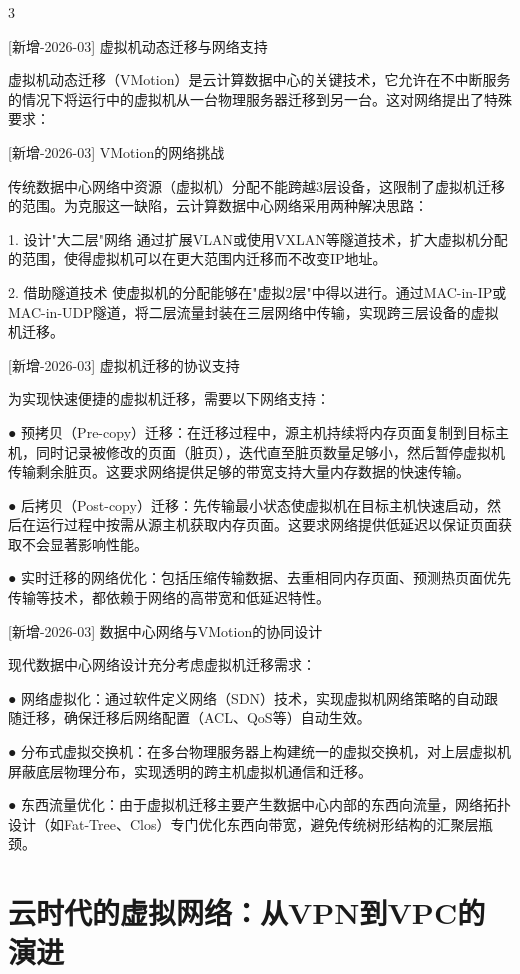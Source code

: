                                                     3


[新增-2026-03] 虚拟机动态迁移与网络支持

虚拟机动态迁移（VMotion）是云计算数据中心的关键技术，它允许在不中断服务的情况下将运行中的虚拟机从一台物理服务器迁移到另一台。这对网络提出了特殊要求：

[新增-2026-03] VMotion的网络挑战

传统数据中心网络中资源（虚拟机）分配不能跨越3层设备，这限制了虚拟机迁移的范围。为克服这一缺陷，云计算数据中心网络采用两种解决思路：

1. 设计"大二层"网络
通过扩展VLAN或使用VXLAN等隧道技术，扩大虚拟机分配的范围，使得虚拟机可以在更大范围内迁移而不改变IP地址。

2. 借助隧道技术
使虚拟机的分配能够在"虚拟2层"中得以进行。通过MAC-in-IP或MAC-in-UDP隧道，将二层流量封装在三层网络中传输，实现跨三层设备的虚拟机迁移。

[新增-2026-03] 虚拟机迁移的协议支持

为实现快速便捷的虚拟机迁移，需要以下网络支持：

 ● 预拷贝（Pre-copy）迁移：在迁移过程中，源主机持续将内存页面复制到目标主机，同时记录被修改的页面（脏页），迭代直至脏页数量足够小，然后暂停虚拟机传输剩余脏页。这要求网络提供足够的带宽支持大量内存数据的快速传输。

 ● 后拷贝（Post-copy）迁移：先传输最小状态使虚拟机在目标主机快速启动，然后在运行过程中按需从源主机获取内存页面。这要求网络提供低延迟以保证页面获取不会显著影响性能。

 ● 实时迁移的网络优化：包括压缩传输数据、去重相同内存页面、预测热页面优先传输等技术，都依赖于网络的高带宽和低延迟特性。

[新增-2026-03] 数据中心网络与VMotion的协同设计

现代数据中心网络设计充分考虑虚拟机迁移需求：

 ● 网络虚拟化：通过软件定义网络（SDN）技术，实现虚拟机网络策略的自动跟随迁移，确保迁移后网络配置（ACL、QoS等）自动生效。

 ● 分布式虚拟交换机：在多台物理服务器上构建统一的虚拟交换机，对上层虚拟机屏蔽底层物理分布，实现透明的跨主机虚拟机通信和迁移。

 ● 东西流量优化：由于虚拟机迁移主要产生数据中心内部的东西向流量，网络拓扑设计（如Fat-Tree、Clos）专门优化东西向带宽，避免传统树形结构的汇聚层瓶颈。

\section{云时代的虚拟网络：从VPN到VPC的演进}

